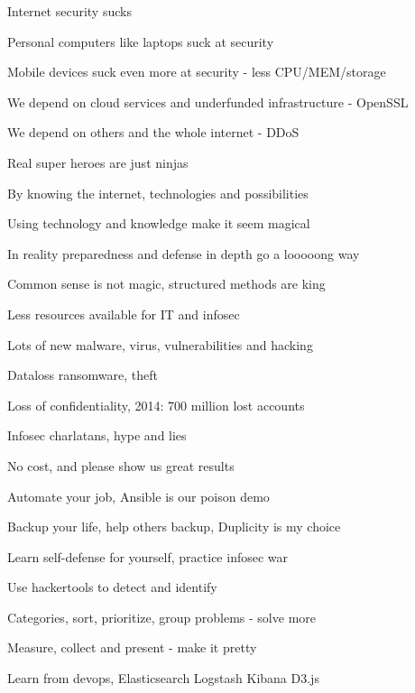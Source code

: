 \documentclass[20pt,landscape,a4paper,footrule]{foils}
\begin{document}

\begin{list1}
\item Internet security sucks
\item Personal computers like laptops suck at security
\item Mobile devices suck even more at security - less CPU/MEM/storage
\item We depend on cloud services and underfunded infrastructure - OpenSSL
\item We depend on others and the whole internet - DDoS
\end{list1}



\begin{list1}
\item Real super heroes are just ninjas
\item By knowing the internet, technologies and possibilities
\item Using technology and knowledge make it seem magical
\item In reality preparedness and defense in depth go a looooong way
\item Common sense is not magic, structured methods are king
\end{list1}


\begin{list1}
\item Less resources available for IT and infosec
\item Lots of new malware, virus, vulnerabilities and hacking
\item Dataloss ransomware, theft
\item Loss of confidentiality, 2014: 700 million lost accounts
\item Infosec charlatans, hype and lies
\end{list1}

\centerline{No cost, and please show us great results}


\begin{list1}
\item Automate your job, Ansible is our poison demo
\item Backup your life, help others backup, Duplicity is my choice
\item {} Learn self-defense for yourself, practice infosec war
\item Use hackertools to detect and identify
\item Categories, sort, prioritize, group problems - solve more
\item Measure, collect and present - make it pretty
\item Learn from devops, Elasticsearch Logstash Kibana D3.js
\end{list1}
\end{document}

